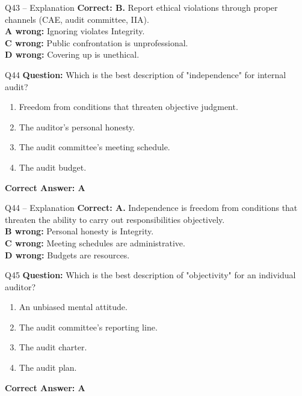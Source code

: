 \documentclass[aspectratio=169,10pt]{beamer}
\begin{document}
	\begin{frame}[t]{Q43 -- Explanation}
		\small
		\textbf{Correct: B.} Report ethical violations through proper channels (CAE, audit committee, IIA). \\[4pt]
		\textbf{A wrong:} Ignoring violates Integrity. \\[2pt]
		\textbf{C wrong:} Public confrontation is unprofessional. \\[2pt]
		\textbf{D wrong:} Covering up is unethical.
	\end{frame}
	
	\begin{frame}[t]{Q44}
		\small
		\textbf{Question:} Which is the best description of "independence" for internal audit?
		\begin{enumerate}[label=\Alph*.,itemsep=1pt,topsep=2pt]
			\item Freedom from conditions that threaten objective judgment.
			\item The auditor's personal honesty.
			\item The audit committee's meeting schedule.
			\item The audit budget.
		\end{enumerate}
		\vspace{4pt}
		\textbf{Correct Answer: A}
	\end{frame}
	
	\begin{frame}[t]{Q44 -- Explanation}
		\small
		\textbf{Correct: A.} Independence is freedom from conditions that threaten the ability to carry out responsibilities objectively. \\[4pt]
		\textbf{B wrong:} Personal honesty is Integrity. \\[2pt]
		\textbf{C wrong:} Meeting schedules are administrative. \\[2pt]
		\textbf{D wrong:} Budgets are resources.
	\end{frame}
	
	\begin{frame}[t]{Q45}
		\small
		\textbf{Question:} Which is the best description of "objectivity" for an individual auditor?
		\begin{enumerate}[label=\Alph*.,itemsep=1pt,topsep=2pt]
			\item An unbiased mental attitude.
			\item The audit committee's reporting line.
			\item The audit charter.
			\item The audit plan.
		\end{enumerate}
		\vspace{4pt}
		\textbf{Correct Answer: A}
	\end{frame}
	
\end{document}
